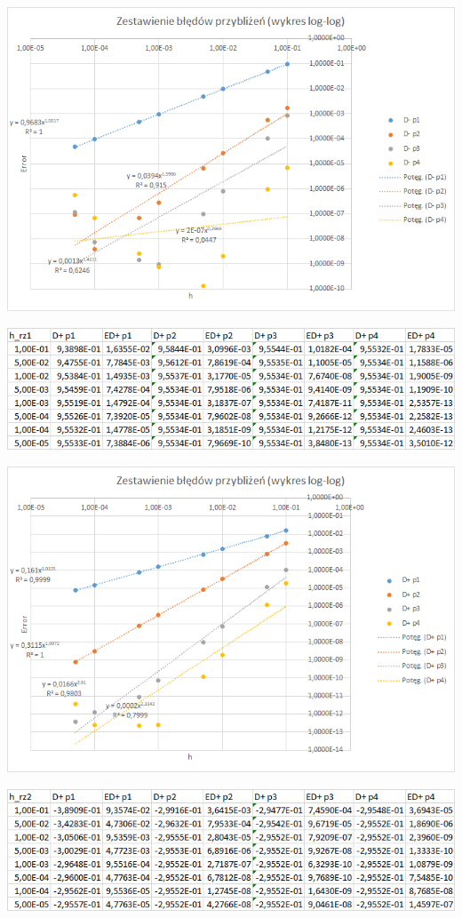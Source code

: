 \includegraphics{Lab2/charts/rz2_log_Db.png}
\newpage


\includegraphics{Lab2/charts/rz1_log_Df_dane.png}

\includegraphics{Lab2/charts/rz1_log_Df.png}
\newpage


\includegraphics{Lab2/charts/rz2_log_Df_dane.png}

